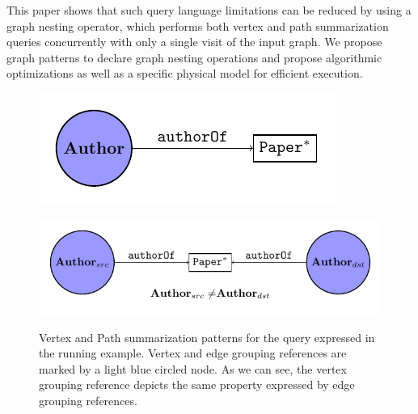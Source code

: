 This paper shows that such query language limitations can be reduced by using a graph nesting operator, which performs both vertex and path summarization queries concurrently with only a single visit of the input graph. %
We propose graph patterns to declare graph nesting operations and propose algorithmic optimizations as well as a specific physical model for efficient execution.
	
\begin{figure}[!t]
	\centering
	\begin{minipage}[!t]{0.5\textwidth}
		\centering
		\includegraphics[width=.6\textwidth]{images/nesting/patterns/00_vertex_pattern.pdf}
		\label{fig:vertexPat}
	\end{minipage} \begin{minipage}[!t]{0.4\textwidth}
		\centering
		\includegraphics[width=1\textwidth]{images/nesting/patterns/00_path_pattern.pdf}
		\label{fig:pathPat}
	\end{minipage}
  \caption{Vertex and Path summarization patterns for the query expressed in the running example. Vertex and edge grouping references are marked by a light blue circled node. As we can see, the vertex grouping reference depicts the same property expressed by edge grouping references.}
\label{fig:patterns}
\end{figure}


